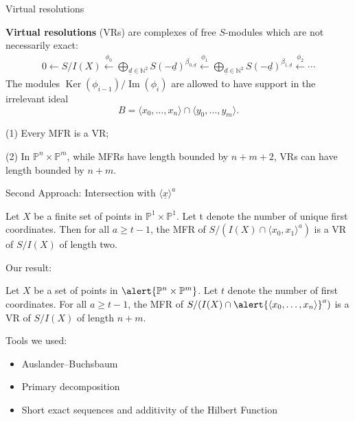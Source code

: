 \documentclass[mathserif
, handout
]{beamer}
\newcommand{\PP}{\mathbb P}
\DeclareMathOperator{\Ker}{Ker}
\DeclareMathOperator{\image}{Im}
\begin{document}
\begin{frame}{Virtual resolutions}
    \small
    \begin{definition}
        \textbf{Virtual resolutions} (VRs) are complexes of free $S$-modules which are not necessarily exact: 
        \begin{multline*}
        0 \longleftarrow S/I(X) \xleftarrow{\phi_0} \bigoplus_{\underline{d}\in \mathbb{N}^2} 
        S(-\underline{d})^{\beta_{0,\underline{d}}}   \xleftarrow{\phi_1} \bigoplus_{\underline{d}\in \mathbb{N}^2} S(-\underline{d})^{\beta_{1,\underline{d}}} \xleftarrow{\phi_2} \cdots 
        \end{multline*}
        The modules $\Ker(\phi_{i-1})/\image(\phi_i)$ are allowed to have support in the irrelevant ideal 
        \[B = \langle x_0,  \ldots, x_n \rangle \cap  \langle y_0, \ldots, y_m\rangle.\] 
    \end{definition}
        (1) Every MFR is a VR;

        (2) In $\PP^n\times \PP^m$, while MFRs have length bounded by $n+m+2$, VRs can have length bounded by $n+m$.

\end{frame}

\begin{frame}{Second Approach: Intersection with \(\langle \underline{x} \rangle^a\)}
    \begin{theorem} 
    Let $X$ be a finite set of points in $\mathbb{P}^1 \times \mathbb{P}^1$. Let t denote the number of unique first coordinates. Then for all $a \geq t- 1$, the MFR of $S/(I(X) \cap \langle x_0, x_1 \rangle ^a)$ is a VR of $S/I(X)$ of length two.
    
    \end{theorem}
    
    Our result: 
    \begin{theorem}[B-B-D-G-S-S 2023+]
    Let $X$ be a set of points in $\alert{\PP^n \times  \PP^m}$. Let $t$ denote the number of first coordinates. For all $a \ge t -1$, the MFR of $S / ( I(X) \cap \alert{\langle x_0, \ldots, x_n\rangle}^a)$ is a VR of $S/I(X)$ of length \alert{$n+m$}.
    \end{theorem}
    
 \end{frame}

 \begin{frame}
    Tools we used: 
\begin{itemize}
\item Auslander--Buchsbaum 
\item Primary decomposition 
\item Short exact sequences and additivity of the Hilbert Function 
\end{itemize}
 \end{frame}
\end{document}
